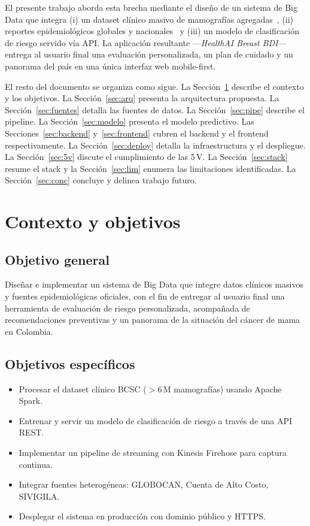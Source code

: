 \documentclass[conference,a4paper,10pt]{IEEEtran}
\begin{document}
El presente trabajo aborda esta brecha mediante el diseño de un sistema de
Big Data que integra (i) un dataset clínico masivo de mamografías
agregadas~\cite{bcsc}, (ii) reportes epidemiológicos globales y
nacionales~\cite{globocan,cac,sivigila} y (iii) un modelo de clasificación
de riesgo servido vía API. La aplicación resultante ---\emph{HealthAI
Breast BDI}--- entrega al usuario final una evaluación personalizada, un
plan de cuidado y un panorama del país en una única interfaz web
mobile-first.

El resto del documento se organiza como sigue. La Sección~\ref{sec:contexto}
describe el contexto y los objetivos. La Sección~\ref{sec:arq} presenta la
arquitectura propuesta. La Sección~\ref{sec:fuentes} detalla las fuentes de
datos. La Sección~\ref{sec:pipe} describe el pipeline. La
Sección~\ref{sec:modelo} presenta el modelo predictivo. Las
Secciones~\ref{sec:backend} y~\ref{sec:frontend} cubren el backend y el
frontend respectivamente. La Sección~\ref{sec:deploy} detalla la
infraestructura y el despliegue. La Sección~\ref{sec:5v} discute el
cumplimiento de las 5\,V. La Sección~\ref{sec:stack} resume el stack y la
Sección~\ref{sec:lim} enumera las limitaciones identificadas. La
Sección~\ref{sec:conc} concluye y delinea trabajo futuro.

\section{Contexto y objetivos}\label{sec:contexto}

\subsection{Objetivo general}
Diseñar e implementar un sistema de Big Data que integre datos clínicos
masivos y fuentes epidemiológicas oficiales, con el fin de entregar al
usuario final una herramienta de evaluación de riesgo personalizada,
acompañada de recomendaciones preventivas y un panorama de la situación
del cáncer de mama en Colombia.

\subsection{Objetivos específicos}
\begin{itemize}[leftmargin=*,nosep]
  \item Procesar el dataset clínico BCSC ($>$6\,M mamografías) usando Apache Spark.
  \item Entrenar y servir un modelo de clasificación de riesgo a través de una API REST.
  \item Implementar un pipeline de streaming con Kinesis Firehose para captura continua.
  \item Integrar fuentes heterogéneas: GLOBOCAN, Cuenta de Alto Costo, SIVIGILA.
  \item Desplegar el sistema en producción con dominio público y HTTPS.
\end{itemize}
\end{document}
